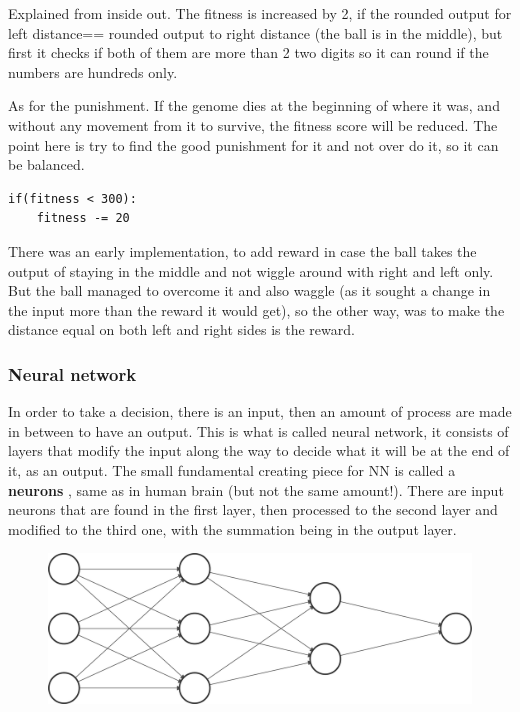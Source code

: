 Explained from inside out. The fitness is increased by 2, if the rounded output for left distance== rounded output to right distance (the ball is in the middle), but first it checks if both of them are more than 2 two digits so it can round if the numbers are hundreds only.

As for the punishment. If the genome dies at the beginning of where it was, and without any movement from it to survive, the fitness score will be reduced. The point here is try to find the good punishment for it and not over do it, so it can be balanced.

\begin{listing}[H]
	\begin{verbatim}
if(fitness < 300):
	fitness -= 20
	\end{verbatim}
\end{listing}

There was an early implementation, to add reward in case the ball takes the output of staying in the middle and not wiggle around with right and left only. But the ball managed to overcome it and also waggle (as it sought a change in the input more than the reward it would get), so the other way, was to make the distance equal on both left and right sides is the reward.

\subsubsection{Neural network}
In order to take a decision, there is an input, then an amount of process are made in between to have an output. This is what is called neural network, it consists of layers that modify the input along the way to decide what it will be at the end of it, as an output. The small fundamental creating piece for NN is called a \textbf{neurons} , same as in human brain (but not the same amount!). There are input neurons that are found in the first layer, then processed to the second layer and modified to the third one, with the summation being in the output layer.

\begin{figure}
	\centering
	\includegraphics[width=0.7\linewidth]{usedImages/nn}
	\caption{}
	\label{fig:nn}
\end{figure}

